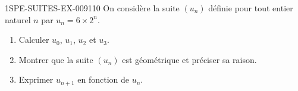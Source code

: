 \begin{exercice}{1SPE-SUITES-EX-009}{1}{10}
On considère la suite $(u_n)$ définie pour tout entier naturel $n$ par
$u_n = 6 \times 2^n$.
\begin{enumerate}
  \item Calculer $u_0$, $u_1$, $u_2$ et $u_3$.
  \item Montrer que la suite $(u_n)$ est géométrique et préciser sa raison.
  \item Exprimer $u_{n+1}$ en fonction de $u_n$.
\end{enumerate}
\end{exercice}
